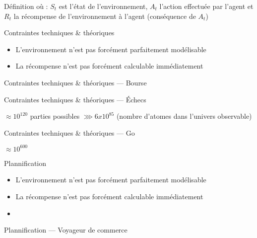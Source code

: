 \begin{frame}{Définition}
  où :
  \newline
  $S_t$ est l'état de l'environnement,
  \newline
  $A_t$ l'action effectuée par l'agent et
  \newline
  $R_t$ la récompense de l'environnement à l'agent (conséquence de $A_t$)
\end{frame}

\begin{frame}{Contraintes techniques \& théoriques}
  \begin{itemize}[<+->]
    \item L'environnement n'est pas forcément parfaitement modélisable
    \item La récompense n'est pas forcément calculable immédiatement
  \end{itemize}
\end{frame}

\begin{frame}{Contraintes techniques \& théoriques --- Bourse}
\end{frame}

\begin{frame}{Contraintes techniques \& théoriques --- Échecs}
  \begin{center}
  \end{center}
  \pause
  \begin{center}
    $\approx 10^{120}$ parties possibles $\ggg 6 x 10^{85}$
    \newline
    (nombre d'atomes dans l'univers observable)
  \end{center}
\end{frame}

\begin{frame}{Contraintes techniques \& théoriques --- Go}
  \begin{center}
    \huge{$\approx 10^{600}$}
  \end{center}
\end{frame}

\begin{frame}{Plannification}
  \begin{itemize}
  \item L'environnement n'est pas forcément parfaitement modélisable
  \item La récompense n'est pas forcément calculable immédiatement
  \item {}
  \end{itemize}
\end{frame}

\begin{frame}{Plannification --- Voyageur de commerce}
\end{frame}

